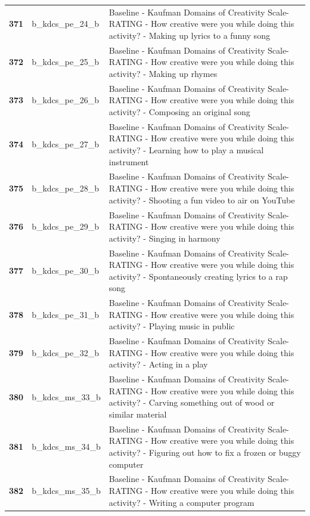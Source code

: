 \documentclass[
  letterpaper,
  DIV=11,
  numbers=noendperiod]{scrartcl}
\begin{document}
\begin{longtable}[t]{>{}cll}
\addlinespace
\textbf{371} & b\_kdcs\_pe\_24\_b & Baseline - Kaufman Domains of Creativity Scale-RATING - How creative were you while doing this activity? - Making up lyrics to a funny song\\
\textbf{372} & b\_kdcs\_pe\_25\_b & Baseline - Kaufman Domains of Creativity Scale-RATING - How creative were you while doing this activity? - Making up rhymes\\
\textbf{373} & b\_kdcs\_pe\_26\_b & Baseline - Kaufman Domains of Creativity Scale-RATING - How creative were you while doing this activity? - Composing an original song\\
\textbf{374} & b\_kdcs\_pe\_27\_b & Baseline - Kaufman Domains of Creativity Scale-RATING - How creative were you while doing this activity? - Learning how to play a musical instrument\\
\textbf{375} & b\_kdcs\_pe\_28\_b & Baseline - Kaufman Domains of Creativity Scale-RATING - How creative were you while doing this activity? - Shooting a fun video to air on YouTube\\
\addlinespace
\textbf{376} & b\_kdcs\_pe\_29\_b & Baseline - Kaufman Domains of Creativity Scale-RATING - How creative were you while doing this activity? - Singing in harmony\\
\textbf{377} & b\_kdcs\_pe\_30\_b & Baseline - Kaufman Domains of Creativity Scale-RATING - How creative were you while doing this activity? - Spontaneously creating lyrics to a rap song\\
\textbf{378} & b\_kdcs\_pe\_31\_b & Baseline - Kaufman Domains of Creativity Scale-RATING - How creative were you while doing this activity? - Playing music in public\\
\textbf{379} & b\_kdcs\_pe\_32\_b & Baseline - Kaufman Domains of Creativity Scale-RATING - How creative were you while doing this activity? - Acting in a play\\
\textbf{380} & b\_kdcs\_ms\_33\_b & Baseline - Kaufman Domains of Creativity Scale-RATING - How creative were you while doing this activity? - Carving something out of wood or similar material\\
\addlinespace
\textbf{381} & b\_kdcs\_ms\_34\_b & Baseline - Kaufman Domains of Creativity Scale-RATING - How creative were you while doing this activity? - Figuring out how to fix a frozen or buggy computer\\
\textbf{382} & b\_kdcs\_ms\_35\_b & Baseline - Kaufman Domains of Creativity Scale-RATING - How creative were you while doing this activity? - Writing a computer program\\

\end{longtable}
\end{document}

